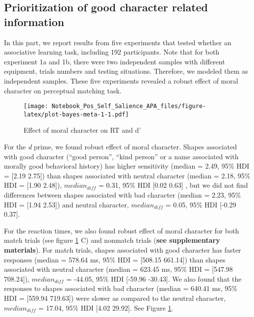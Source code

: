\documentclass[
  man]{apa6}
\begin{document}
\hypertarget{prioritization-of-good-character-related-information}{%
\subsection{Prioritization of good character related information}\label{prioritization-of-good-character-related-information}}

In this part, we report results from five experiments that tested whether an associative learning task, including 192 participants. Note that for both experiment 1a and 1b, there were two independent samples with different equipment, trials numbers and testing situations. Therefore, we modeled them as independent samples. These five experiments revealed a robust effect of moral character on perceptual matching task.

\begin{figure}
\centering
\texttt{[image: Notebook\_Pos\_Self\_Salience\_APA\_files/figure-latex/plot-bayes-meta-1-1.pdf]}
\caption{\label{fig:plot-bayes-meta-1}Effect of moral character on RT and d'}
\end{figure}

For the \emph{d} prime, we found robust effect of moral character. Shapes associated with good character (``good person'', ``kind person'' or a name associated with morally good behavioral history) has higher sensitivity (median = 2.49, 95\% HDI = {[}2.19 2.75{]}) than shapes associated with neutral character (median = 2.18, 95\% HDI = {[}1.90 2.48{]}), \(median_{diff}\) = 0.31, 95\% HDI {[}0.02 0.63{]} , but we did not find differences between shapes associated with bad character (median = 2.23, 95\% HDI = {[}1.94 2.53{]}) and neutral character, \(median_{diff}\) = 0.05, 95\% HDI {[}-0.29 0.37{]}.

For the reaction times, we also found robust effect of moral character for both match trials (see figure \ref{fig:plot-bayes-meta-1} C) and nonmatch trials (\textbf{see supplementary materials}). For match trials, shapes associated with good character has faster responses (median = 578.64 ms, 95\% HDI = {[}508.15 661.14{]}) than shapes associated with neutral character (median = 623.45 ms, 95\% HDI = {[}547.98 708.24{]}), \(median_{diff}\) = -44.05, 95\% HDI {[}-59.96 -30.43{]}. We also found that the responses to shapes associated with bad character (median = 640.41 ms, 95\% HDI = {[}559.94 719.63{]}) were slower as compared to the neutral character, \(median_{diff}\) = 17.04, 95\% HDI {[}4.02 29.92{]}. See Figure \ref{fig:plot-bayes-meta-1}.
\end{document}
